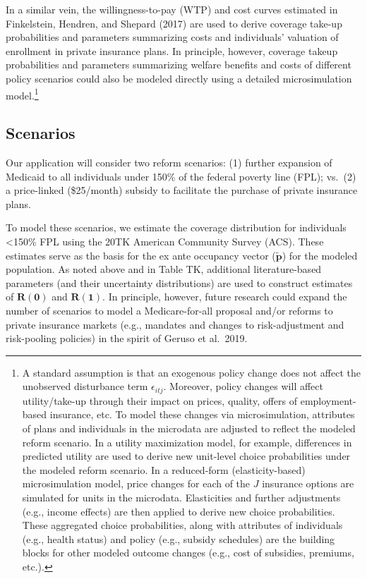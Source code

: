 \documentclass[
  10pt,
]{article}
\begin{document}
In a similar vein, the willingness-to-pay (WTP) and cost curves
estimated in Finkelstein, Hendren, and Shepard (2017) are used to derive
coverage take-up probabilities and parameters summarizing costs and
individuals' valuation of enrollment in private insurance plans. In
principle, however, coverage takeup probabilities and parameters
summarizing welfare benefits and costs of different policy scenarios
could also be modeled directly using a detailed microsimulation
model.\footnote{A standard assumption is that an exogenous policy change
  does not affect the unobserved disturbance term \(\epsilon_{itj}\).
  Moreover, policy changes will affect utility/take-up through their
  impact on prices, quality, offers of employment-based insurance, etc.
  To model these changes via microsimulation, attributes of plans and
  individuals in the microdata are adjusted to reflect the modeled
  reform scenario. In a utility maximization model, for example,
  differences in predicted utility are used to derive new unit-level
  choice probabilities under the modeled reform scenario. In a
  reduced-form (elasticity-based) microsimulation model, price changes
  for each of the \(J\) insurance options are simulated for units in the
  microdata. Elasticities and further adjustments (e.g., income effects)
  are then applied to derive new choice probabilities. These aggregated
  choice probabilities, along with attributes of individuals (e.g.,
  health status) and policy (e.g., subsidy schedules) are the building
  blocks for other modeled outcome changes (e.g., cost of subsidies,
  premiums, etc.).}

\hypertarget{scenarios}{%
\subsection{Scenarios}\label{scenarios}}

Our application will consider two reform scenarios: (1) further
expansion of Medicaid to all individuals under 150\% of the federal
poverty line (FPL); vs.~(2) a price-linked (\$25/month) subsidy to
facilitate the purchase of private insurance plans.

To model these scenarios, we estimate the coverage distribution for
individuals \textless150\% FPL using the 20TK American Community Survey
(ACS). These estimates serve as the basis for the ex ante occupancy
vector (\(\boldsymbol{\tilde{p}}\)) for the modeled population. As noted
above and in Table TK, additional literature-based parameters (and their
uncertainty distributions) are used to construct estimates of
\(\boldsymbol{R(0)}\) and \(\boldsymbol{R(1)}\). In principle, however,
future research could expand the number of scenarios to model a
Medicare-for-all proposal and/or reforms to private insurance markets
(e.g., mandates and changes to risk-adjustment and risk-pooling
policies) in the spirit of Geruso et al.~2019.
\end{document}
